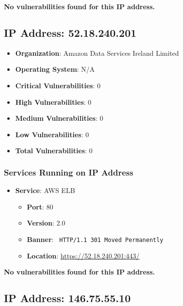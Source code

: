 \documentclass{article}
\begin{document}
\textbf{No vulnerabilities found for this IP address.}


\clearpage



\subsection*{IP Address: 52.18.240.201}

\begin{itemize}
    \item \textbf{Organization}: Amazon Data Services Ireland Limited
    \item \textbf{Operating System}:  N/A 
    \item \textbf{Critical Vulnerabilities}: 0
    \item \textbf{High Vulnerabilities}: 0
    \item \textbf{Medium Vulnerabilities}: 0
    \item \textbf{Low Vulnerabilities}: 0
    \item \textbf{Total Vulnerabilities}: 0
\end{itemize}

\subsubsection*{Services Running on IP Address}

\begin{itemize}
    
        \item \textbf{Service}: AWS ELB
        \begin{itemize}
            \item \textbf{Port}: 80
            \item \textbf{Version}:  2.0 
            \item \textbf{Banner}: \texttt{ HTTP/1.1 301 Moved Permanently
 }
            \item \textbf{Location}: \href{ https://52.18.240.201:443/ }{ https://52.18.240.201:443/ }
        \end{itemize}
    
\end{itemize}


\textbf{No vulnerabilities found for this IP address.}


\clearpage



\subsection*{IP Address: 146.75.55.10}
\end{document}
